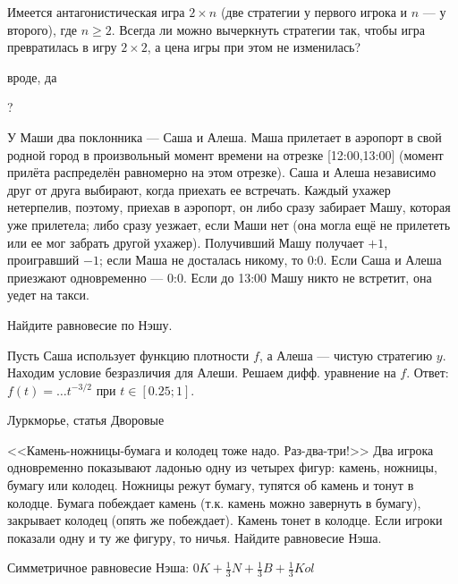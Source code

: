 \begin{problem}

Имеется антагонистическая игра $2\times n$ (две стратегии у первого игрока и $n$ --- у второго), где $n\ge 2$. Всегда ли можно вычеркнуть стратегии так, чтобы игра превратилась в игру $2\times 2$, а цена игры при этом не изменилась?

\begin{sol}
 вроде, да
\end{sol}
\end{problem}

\begin{problem}
\begin{source}
\cite{ferguson:tn}?\end{source}
У Маши два поклонника --- Саша и Алеша. Маша прилетает в аэропорт в свой родной город {\red в произвольный момент времени на отрезке [12:00,13:00] (момент прилёта распределён равномерно на этом отрезке)}. Саша и Алеша независимо друг от друга выбирают, когда приехать ее встречать. Каждый ухажер нетерпелив, поэтому, приехав в аэропорт, он либо сразу забирает Машу, которая уже прилетела; либо сразу уезжает, если Маши нет (она могла ещё не прилететь или ее мог забрать другой ухажер). Получивший Машу получает $+1$, проигравший $-1$; если Маша не досталась никому, то 0:0. Если Саша и Алеша приезжают одновременно --- 0:0. Если до 13:00 Машу никто не встретит, она уедет на такси. 

Найдите равновесие по Нэшу.



\begin{sol}
Пусть Саша использует функцию плотности $f$, а Алеша --- чистую стратегию $y$. Находим условие безразличия для Алеши. Решаем дифф. уравнение на $f$. Ответ: $f(t)=\ldots t^{-3/2}$ при $t\in[0.25;1]$.
\end{sol}
\end{problem}



\begin{problem}[КНБ-2.]
\begin{source}
Луркморье, статья Дворовые
\end{source}
<<Камень-ножницы-бумага и колодец тоже надо. Раз-два-три!>>
Два игрока одновременно показывают ладонью одну из четырех фигур: камень, ножницы, бумагу или колодец. Ножницы режут бумагу, тупятся об камень и тонут в колодце. Бумага побеждает камень (т.к. камень можно завернуть в бумагу), закрывает колодец (опять же побеждает). Камень тонет в колодце. Если игроки показали одну и ту же фигуру, то ничья. Найдите равновесие Нэша.

\begin{sol}
Симметричное равновесие Нэша: $0K+\frac{1}{3}N+\frac{1}{3}B+\frac{1}{3}Kol$
\end{sol}
\end{problem}

